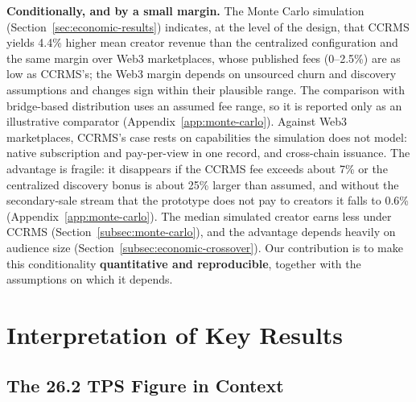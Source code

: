 \textbf{Conditionally, and by a small margin.} The Monte Carlo simulation (Section~\ref{sec:economic-results}) indicates, at the level of the design, that CCRMS yields 4.4\% higher mean creator revenue than the centralized configuration and the same margin over Web3 marketplaces, whose published fees (0--2.5\%) are as low as CCRMS's; the Web3 margin depends on unsourced churn and discovery assumptions and changes sign within their plausible range. The comparison with bridge-based distribution uses an assumed fee range, so it is reported only as an illustrative comparator (Appendix~\ref{app:monte-carlo}). Against Web3 marketplaces, CCRMS's case rests on capabilities the simulation does not model: native subscription and pay-per-view in one record, and cross-chain issuance. The advantage is fragile: it disappears if the CCRMS fee exceeds about 7\% or the centralized discovery bonus is about 25\% larger than assumed, and without the secondary-sale stream that the prototype does not pay to creators it falls to 0.6\% (Appendix~\ref{app:monte-carlo}). The median simulated creator earns less under CCRMS (Section~\ref{subsec:monte-carlo}), and the advantage depends heavily on audience size (Section~\ref{subsec:economic-crossover}). Our contribution is to make this conditionality \textbf{quantitative and reproducible}, together with the assumptions on which it depends.

\section{Interpretation of Key Results}\label{sec:interpretation}

\subsection{The 26.2 TPS Figure in Context}\label{subsec:26-tps-context}

